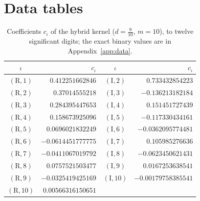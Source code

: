 \documentclass[11pt,reqno]{amsart}
\numberwithin{equation}{section}
\theoremstyle{definition}
\theoremstyle{remark}
\begin{document}
\appendix
\section{Data tables}\label{app:tables}
\begin{table}[ht]\centering\small
\begin{tabular}{@{}cr@{\quad}cr@{}}\toprule $\iota$ & $c_\iota$ & $\iota$ & $c_\iota$\\\midrule
$(\mathrm R,1)$ & $0.412251662846$ & $(\mathrm I,2)$ & $0.733432854223$\\
$(\mathrm R,2)$ & $0.37014555218$ & $(\mathrm I,3)$ & $-0.136213182184$\\
$(\mathrm R,3)$ & $0.284395447653$ & $(\mathrm I,4)$ & $0.151451727439$\\
$(\mathrm R,4)$ & $0.158673925096$ & $(\mathrm I,5)$ & $-0.117330434161$\\
$(\mathrm R,5)$ & $0.0696021832249$ & $(\mathrm I,6)$ & $-0.0362095774481$\\
$(\mathrm R,6)$ & $-0.0614451777775$ & $(\mathrm I,7)$ & $0.105985276636$\\
$(\mathrm R,7)$ & $-0.0411067019792$ & $(\mathrm I,8)$ & $-0.0623450621431$\\
$(\mathrm R,8)$ & $0.0757521503477$ & $(\mathrm I,9)$ & $0.0167253638541$\\
$(\mathrm R,9)$ & $-0.0325419425169$ & $(\mathrm I,10)$ & $-0.00179758385541$\\
$(\mathrm R,10)$ & $0.00566316150651$ & & \\
\bottomrule\end{tabular}
\caption{Coefficients $c_\iota$ of the hybrid kernel ($d=\frac9{10}$, $m=10$), to twelve significant digits; the exact binary values are in Appendix~\ref{app:data}.}\label{tab:hybrid_kernel}\end{table}
\end{document}
